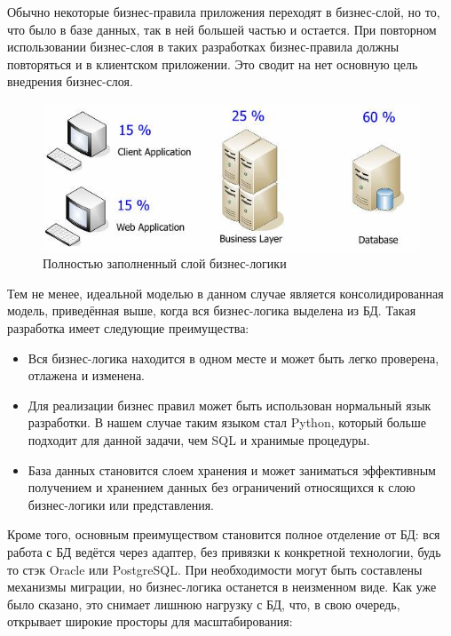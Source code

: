 \documentclass[14pt, a4paper]{extreport}
\begin{document}
Обычно некоторые бизнес-правила приложения переходят в бизнес-слой, но то, что было в базе данных, так в ней большей частью и остается. При повторном использовании бизнес-слоя в таких разработках бизнес-правила должны повторяться и в клиентском приложении. Это сводит на нет основную цель внедрения бизнес-слоя.

\begin{figure}[!htb]
  \centering
    \includegraphics[scale=0.6]{../shared_images/business-logic/client-server-business-2.jpg}
   \caption{Полностью заполненный слой бизнес-логики}
    \label{fig:start}
\end{figure}

Тем не менее, идеальной моделью в данном случае является консолидированная модель, приведённая выше, когда вся бизнес-логика выделена из БД. Такая разработка имеет следующие преимущества:

\begin{itemize}
  \item Вся бизнес-логика находится в одном месте и может быть легко проверена, отлажена и изменена.
  \item Для реализации бизнес правил может быть использован нормальный язык разработки. В нашем случае таким языком стал Python, который больше подходит для данной задачи, чем SQL и хранимые процедуры.
  \item База данных становится слоем хранения и может заниматься эффективным получением и хранением данных без ограничений относящихся к слою бизнес-логики или представления.
\end{itemize}

Кроме того, основным преимуществом становится полное отделение от БД: вся работа с БД ведётся через адаптер, без привязки к конкретной технологии, будь то стэк Oracle или PostgreSQL. При необходимости могут быть составлены механизмы миграции, но бизнес-логика останется в неизменном виде. Как уже было сказано, это снимает лишнюю нагрузку с БД, что, в свою очередь, открывает широкие просторы для масштабирования:
\end{document}
